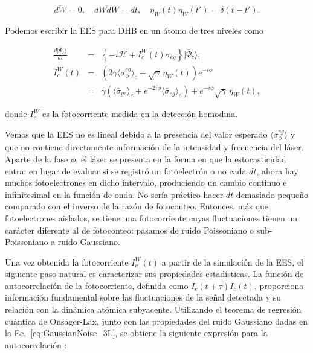 \documentclass[12pt]{article}
\newcommand{\mcH}{\mathcal{H}}
\newcommand{\ket}[1]{\lvert #1 \rangle}
\begin{document}
\begin{equation} \label{eq:GaussianNoise_3L}
\overline{dW} = 0, \quad \overline{dW dW} = dt, \quad 
\overline{\eta_W(t) \eta_W(t')} = \delta(t-t').
\end{equation}

Podemos escribir la EES para DHB en un átomo de tres niveles como

\begin{subequations}
\begin{eqnarray}
\frac{d \ket{\bar{\Psi}_c}}{dt} 
	&=& \left\{ -i \mcH + I_c^W(t) \sigma_{eg} \right\} \ket{\bar{\Psi}_c}, \\
I_c^W(t) &=& \left(2 \gamma \langle \sigma_{\phi}^{eg} \rangle_c  
	+ \sqrt{\gamma} \,\eta_W(t) \right) e^{-i\phi} \\
&=& \gamma \left( \langle \bar{\sigma}_{ge} \rangle_c  
	+ e^{-2i\phi} \langle \bar{\sigma}_{eg} \rangle_c \right) 
	+ e^{-i\phi} \sqrt{\gamma} \, \eta_W(t), \nonumber 
\label{HomodyneSSE_3L}
\end{eqnarray}
\end{subequations}

donde $I_c^W$ es la fotocorriente medida en la detección homodina.

Vemos que la EES no es lineal debido a la presencia del valor esperado $\langle \sigma_{\phi}^{eg} \rangle$ y que no contiene directamente información de la intensidad y frecuencia del láser. Aparte de la fase $\phi$, el láser se presenta en la forma en que la estocasticidad entra: en lugar de evaluar si se registró un fotoelectrón o no cada $dt$, ahora hay muchos fotoelectrones en dicho intervalo, produciendo un cambio continuo e infinitesimal en la función de onda. No sería práctico hacer $dt$ demasiado pequeño comparado con el inverso de la razón de fotoconteo. Entonces, más que fotoelectrones aislados, se tiene una fotocorriente cuyas fluctuaciones tienen un carácter diferente al de fotoconteo: pasamos de ruido Poissoniano o sub-Poissoniano a ruido Gaussiano. 

Una vez obtenida la fotocorriente $I_c^W(t)$ a partir de la simulación de la EES, el siguiente paso natural es caracterizar sus propiedades estadísticas. La función de autocorrelación de la fotocorriente, definida como $\overline{I_c(t+\tau) I_c(t)}$, proporciona información fundamental sobre las fluctuaciones de la señal detectada y su relación con la dinámica atómica subyacente. Utilizando el teorema de regresión cuántica de Onsager-Lax, junto con las propiedades del ruido Gaussiano dadas en la Ec.~\eqref{eq:GaussianNoise_3L}, se obtiene la siguiente expresión para la autocorrelación \cite{WisemanMilburn2009}:
\end{document}
